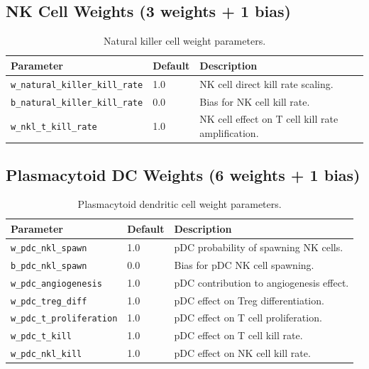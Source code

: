 \subsection{NK Cell Weights (3 weights + 1 bias)}

\begin{table}[H]
\centering
\caption{Natural killer cell weight parameters.}
\label{tab:nk-weights}
\begin{tabular}{@{}llp{5.5cm}@{}}
\toprule
\textbf{Parameter} & \textbf{Default} & \textbf{Description} \\
\midrule
\texttt{w\_natural\_killer\_kill\_rate} & 1.0 & NK cell direct kill rate scaling. \\
\texttt{b\_natural\_killer\_kill\_rate} & 0.0 & Bias for NK cell kill rate. \\
\texttt{w\_nkl\_t\_kill\_rate} & 1.0 & NK cell effect on T cell kill rate amplification. \\
\bottomrule
\end{tabular}
\end{table}

\subsection{Plasmacytoid DC Weights (6 weights + 1 bias)}

\begin{table}[H]
\centering
\caption{Plasmacytoid dendritic cell weight parameters.}
\label{tab:pdc-weights}
\begin{tabular}{@{}llp{5.5cm}@{}}
\toprule
\textbf{Parameter} & \textbf{Default} & \textbf{Description} \\
\midrule
\texttt{w\_pdc\_nkl\_spawn} & 1.0 & pDC probability of spawning NK cells. \\
\texttt{b\_pdc\_nkl\_spawn} & 0.0 & Bias for pDC NK cell spawning. \\
\texttt{w\_pdc\_angiogenesis} & 1.0 & pDC contribution to angiogenesis effect. \\
\texttt{w\_pdc\_treg\_diff} & 1.0 & pDC effect on Treg differentiation. \\
\texttt{w\_pdc\_t\_proliferation} & 1.0 & pDC effect on T cell proliferation. \\
\texttt{w\_pdc\_t\_kill} & 1.0 & pDC effect on T cell kill rate. \\
\texttt{w\_pdc\_nkl\_kill} & 1.0 & pDC effect on NK cell kill rate. \\
\bottomrule
\end{tabular}
\end{table}

